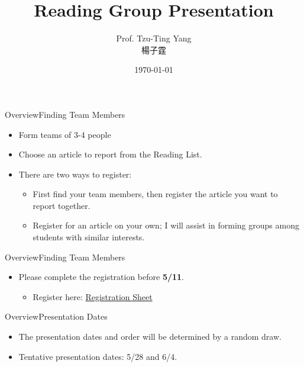 \documentclass[hyperref={pdfpagelabels=false}]{beamer}
\title[]  
{Reading Group Presentation}
\author 
{Prof. Tzu-Ting Yang  \\ 楊子霆}
\institute{Institute of Economics, Academia Sinica  \\ 中央研究院經濟研究所}
\date
{\today}
\begin{document}
\begin{frame}{}
 \titlepage
\end{frame}


\begin{frame}{Overview}{Finding Team Members}
	\begin{itemize}
		\item Form teams of 3-4 people
				\vspace{0.2cm}
		\item Choose an article to report from the Reading List. 
						\vspace{0.2cm}
		\item There are two ways to register:
		\begin{itemize}
			\item First find your team members, then register the article you want to report together.
							\vspace{0.2cm}
			\item Register for an article on your own; I will assist in forming groups among students with similar interests.
							\vspace{0.2cm}
		\end{itemize}
	
		
		
	\end{itemize}
\end{frame}




\begin{frame}{Overview}{Finding Team Members}
	\begin{itemize}
	
		\item Please complete the registration before  \textbf{5/11}.
					\vspace{0.2cm}
				\begin{itemize}
		
		\item Register here: \href{https://docs.google.com/spreadsheets/d/1mgXnJXzcy_I7ISeFNNfc9s5lI4cL-Zp5/edit?gid=1810002485\#gid=1810002485}{Registration Sheet}
		
				\end{itemize}
	\end{itemize}
\end{frame}


\begin{frame}{Overview}{Presentation Dates}
	\begin{itemize}
		\item The presentation dates and order will be determined by a random draw.
									\vspace{0.2cm}
		\item Tentative presentation dates: 5/28 and 6/4.
	\end{itemize}
\end{frame}
\end{document}
